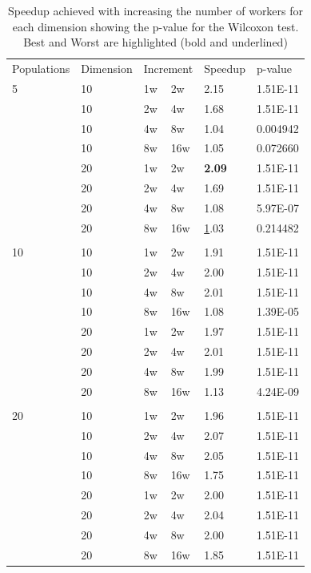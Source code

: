 \documentclass[review]{elsarticle}
\begin{document}
\begin{table}[h!tbp]
  \small
  \caption{Speedup achieved with increasing the number of workers for
    each dimension showing the p-value for the Wilcoxon test. 
    Best and Worst are highlighted (bold and underlined)}
  \label{tab:speedup:test}
  \vspace{0.25cm}
  \centering
  \begin{tabular}{llllll}
  Populations & Dimension  & \multicolumn{2}{l}{Increment}  & Speedup            & p-value\\
  5  & 10 & 1w & 2w  & 2.15 & 1.51E-11 \\
  & 10 & 2w & 4w  & 1.68 & 1.51E-11 \\
  & 10 & 4w & 8w  & 1.04 & 0.004942 \\
  & 10 & 8w & 16w & 1.05 & 0.072660 \\
  & 20 & 1w & 2w  & \textbf{2.09} & 1.51E-11 \\
  & 20 & 2w & 4w  & 1.69 & 1.51E-11 \\
  & 20 & 4w & 8w  & 1.08 & 5.97E-07 \\
  & 20 & 8w & 16w & {\ul 1.03} & 0.214482 \\
  &    &    &     &      &          \\
10 & 10 & 1w & 2w  & 1.91 & 1.51E-11 \\
  & 10 & 2w & 4w  & 2.00 & 1.51E-11 \\
  & 10 & 4w & 8w  & 2.01 & 1.51E-11 \\
  & 10 & 8w & 16w & 1.08 & 1.39E-05 \\
  & 20 & 1w & 2w  & 1.97 & 1.51E-11 \\
  & 20 & 2w & 4w  & 2.01 & 1.51E-11 \\
  & 20 & 4w & 8w  & 1.99 & 1.51E-11 \\
  & 20 & 8w & 16w & 1.13 & 4.24E-09 \\
  &    &    &     &      &          \\
 20 & 10 & 1w & 2w  & 1.96 & 1.51E-11 \\
  & 10 & 2w & 4w  & 2.07 & 1.51E-11 \\
  & 10 & 4w & 8w  & 2.05 & 1.51E-11 \\
  & 10 & 8w & 16w & 1.75 & 1.51E-11 \\
  & 20 & 1w & 2w  & 2.00 & 1.51E-11 \\
  & 20 & 2w & 4w  & 2.04 & 1.51E-11 \\
  & 20 & 4w & 8w  & 2.00 & 1.51E-11 \\
  & 20 & 8w & 16w & 1.85 & 1.51E-11 \\
 \end{tabular}
  \end{table}
\end{document}
